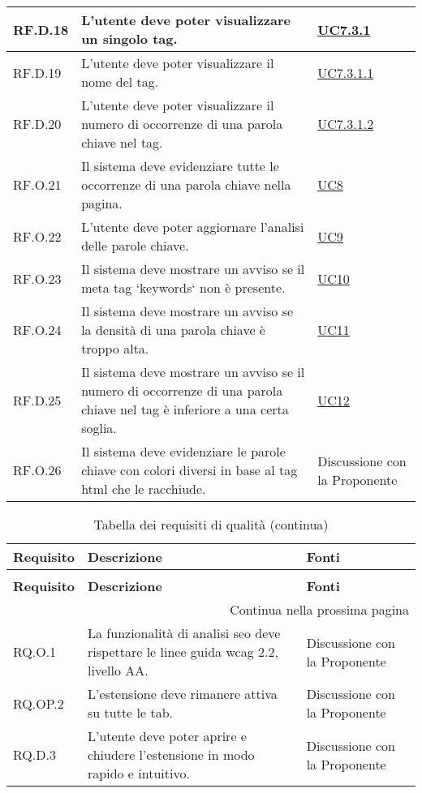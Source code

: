 \begin{longtable}{p{}p{}p{}}
\hline
RF.D.18 & L'utente deve poter visualizzare un singolo tag. & \hyperref[UC7point3point1]{UC7.3.1} \\
\hline
RF.D.19 & L'utente deve poter visualizzare il nome del tag. & \hyperref[UC7point3point1point1]{UC7.3.1.1} \\
\hline
RF.D.20 & L'utente deve poter visualizzare il numero di occorrenze di una parola chiave nel tag. & \hyperref[UC7point3point1point2]{UC7.3.1.2} \\
\hline
RF.O.21 & Il sistema deve evidenziare tutte le occorrenze di una parola chiave nella pagina. & \hyperref[UC8]{UC8} \\
\hline
RF.O.22 & L'utente deve poter aggiornare l'analisi delle parole chiave. & \hyperref[UC9]{UC9} \\
\hline
RF.O.23 & Il sistema deve mostrare un avviso se il meta tag `keywords` non è presente. & \hyperref[UC10]{UC10} \\
\hline
RF.O.24 & Il sistema deve mostrare un avviso se la densità di una parola chiave è troppo alta. & \hyperref[UC11]{UC11} \\
\hline
RF.D.25 & Il sistema deve mostrare un avviso se il numero di occorrenze di una parola chiave nel tag è inferiore a una certa soglia. & \hyperref[UC12]{UC12} \\
\hline
RF.O.26 & Il sistema deve evidenziare le parole chiave con colori diversi in base al tag \gls{html} che le racchiude. & Discussione con la Proponente \\
\end{longtable}

\newpage

\renewcommand{\arraystretch}{1.5}
\begin{longtable}{p{}p{}p{}}
\caption{Tabella dei requisti di qualità}
\label{tab:requisiti-qualitativi} \\
\hline\hline
\textbf{Requisito} & \textbf{Descrizione} & \textbf{Fonti}\\
\endfirsthead
    
\caption[]{Tabella dei requisiti di qualità (continua)} \\
\hline\hline
\textbf{Requisito} & \textbf{Descrizione} & \textbf{Fonti} \\ 
\endhead
    
\multicolumn{3}{r}{{Continua nella prossima pagina}} \\ 
\endfoot
    
\hline
\endlastfoot

\hline
RQ.O.1 & La funzionalità di analisi \gls{seo} deve rispettare le linee guida \gls{wcag} 2.2, livello AA. & Discussione con la Proponente \\
\hline
RQ.OP.2 & L'estensione deve rimanere attiva su tutte le tab. & Discussione con la Proponente \\
\hline
RQ.D.3 & L'utente deve poter aprire e chiudere l'estensione in modo rapido e intuitivo. & Discussione con la Proponente \\
\end{longtable}

